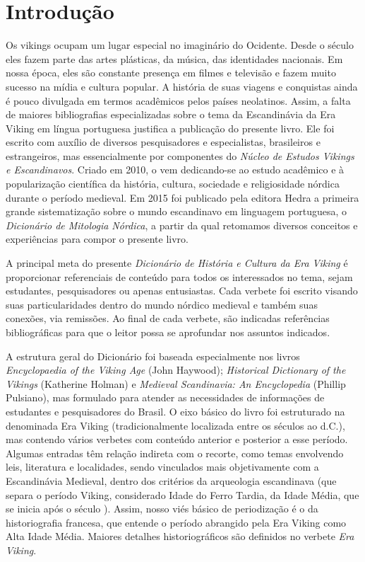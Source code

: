 \chapter[Introdução, \emph{por Johnni Langer}]{Introdução}\label{introd}

Os vikings ocupam um lugar especial no imaginário do Ocidente. Desde o
século  eles fazem parte das artes plásticas, da música, das
identidades nacionais. Em nossa época, eles são constante presença em
filmes e televisão e fazem muito sucesso na mídia e cultura popular. A
história de suas viagens e conquistas ainda é pouco divulgada em termos
acadêmicos pelos países neolatinos. Assim, a falta de maiores
bibliografias especializadas sobre o tema da Escandinávia da Era Viking
em língua portuguesa justifica a publicação do presente livro. Ele foi
escrito com auxílio de diversos pesquisadores e especialistas,
brasileiros e estrangeiros, mas essencialmente por componentes do
\emph{Núcleo de Estudos Vikings e Escandinavos}. Criado em 2010, o 
vem dedicando-se ao estudo acadêmico e à popularização científica da
história, cultura, sociedade e religiosidade nórdica durante o período
medieval. Em 2015 foi publicado pela editora Hedra a primeira grande
sistematização sobre o mundo escandinavo em linguagem portuguesa, o
\emph{Dicionário de Mitologia Nórdica}, a partir da qual retomamos
diversos conceitos e experiências para compor o presente livro.

A principal meta do presente \emph{Dicionário de História e Cultura da
Era Viking} é proporcionar referenciais de conteúdo para todos os
interessados no tema, sejam estudantes, pesquisadores ou apenas
entusiastas. Cada verbete foi escrito visando suas particularidades
dentro do mundo nórdico medieval e também suas conexões, via remissões.
Ao final de cada verbete, são indicadas referências bibliográficas para
que o leitor possa se aprofundar nos assuntos indicados.

A estrutura geral do Dicionário foi baseada especialmente nos livros
\emph{Encyclopaedia of the Viking Age} (John Haywood); \emph{Historical
Dictionary of the Vikings} (Katherine Holman) e \emph{Medieval
Scandinavia: An Encyclopedia} (Phillip Pulsiano), mas formulado para
atender as necessidades de informações de estudantes e pesquisadores do
Brasil. O eixo básico do livro foi estruturado na denominada Era Viking
(tradicionalmente localizada entre os séculos  ao  d.C.), mas
contendo vários verbetes com conteúdo anterior e posterior a esse
período. Algumas entradas têm relação indireta com o recorte, como temas
envolvendo leis, literatura e localidades, sendo vinculados mais
objetivamente com a Escandinávia Medieval, dentro dos critérios da
arqueologia escandinava (que separa o período Viking, considerado Idade
do Ferro Tardia, da Idade Média, que se inicia após o século ).
Assim, nosso viés básico de periodização é o da historiografia francesa,
que entende o período abrangido pela Era Viking como Alta Idade
Média. Maiores detalhes historiográficos são definidos no verbete
\emph{Era Viking}.


